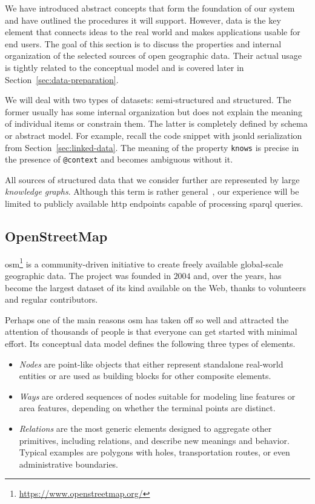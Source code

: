We have introduced abstract concepts that form the foundation of our system and have outlined the procedures it will support. However, data is the key element that connects ideas to the real world and makes applications usable for end users. The goal of this section is to discuss the properties and internal organization of the selected sources of open geographic data. Their actual usage is tightly related to the conceptual model and is covered later in Section~\ref{sec:data-preparation}.

We will deal with two types of datasets: semi-structured and structured. The former usually has some internal organization but does not explain the meaning of individual items or constrain them. The latter is completely defined by schema or abstract model. For example, recall the code snippet with \acs{jsonld} serialization from Section~\ref{sec:linked-data}. The meaning of the property \texttt{knows} is precise in the presence of \texttt{@context} and becomes ambiguous without it.

All sources of structured data that we consider further are represented by large \emph{knowledge graphs}. Although this term is rather general~\cite{kgbook21}, our experience will be limited to publicly available \acs{http} endpoints capable of processing \acs{sparql} queries.

\subsection{OpenStreetMap}

\ac{osm}\footnote{\href{https://www.openstreetmap.org/}{https://www.openstreetmap.org/}} is a community-driven initiative to create freely available global-scale geographic data. The project was founded in $2004$ and, over the years, has become the largest dataset of its kind available on the Web, thanks to volunteers and regular contributors.

Perhaps one of the main reasons \acs{osm} has taken off so well and attracted the attention of thousands of people is that everyone can get started with minimal effort. Its conceptual data model defines the following three types of elements.

\begin{itemize}
\item \emph{Nodes} are point-like objects that either represent standalone real-world entities or are used as building blocks for other composite elements.
\item \emph{Ways} are ordered sequences of nodes suitable for modeling line features or area features, depending on whether the terminal points are distinct.
\item \emph{Relations} are the most generic elements designed to aggregate other primitives, including relations, and describe new meanings and behavior. Typical examples are polygons with holes, transportation routes, or even administrative boundaries.
\end{itemize}

